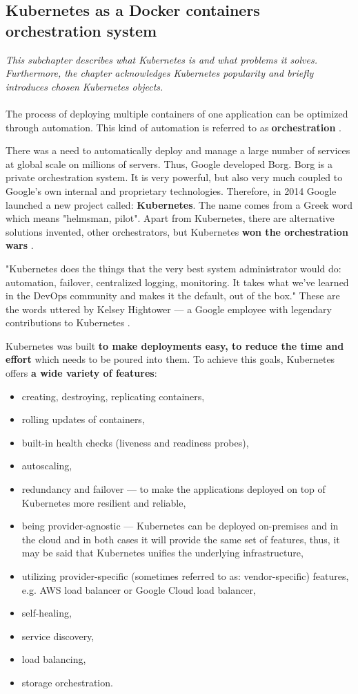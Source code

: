 \subsection{Kubernetes as a Docker containers orchestration system}
\textit{This subchapter describes what Kubernetes is and what problems it solves. Furthermore, the chapter acknowledges Kubernetes popularity and briefly introduces chosen Kubernetes objects.}
~\\
~\\
The process of deploying multiple containers of one application can be optimized through automation. This kind of automation is referred to as \textbf{orchestration} \cite{art-byza}.

There was a need to automatically deploy and manage a large number of services at global scale on millions of servers. Thus, Google developed Borg. Borg is a private orchestration system. It is very powerful, but also very much coupled to Google’s own internal and proprietary technologies. Therefore, in 2014 Google launched a new project called: \textbf{Kubernetes}. The name comes from a Greek word which means "helmsman, pilot". Apart from Kubernetes, there are alternative solutions invented, other orchestrators, but Kubernetes \textbf{won the orchestration wars} \cite{book-cndwk,article-modelling-performance-k8s}.

"Kubernetes does the things that the very best system administrator would do: automation, failover, centralized logging, monitoring. It takes what we’ve learned in the DevOps community and makes it the default, out of the box." These are the words uttered by Kelsey Hightower --- a Google employee with legendary contributions to Kubernetes \cite{book-cndwk}.

Kubernetes was built \textbf{to make deployments easy, to reduce the time and effort} which needs to be poured into them. To achieve this goals, Kubernetes offers \textbf{a wide variety of features}\cite{k8s,book-cndwk,article-state-machine}:
\begin{itemize}
\item creating, destroying, replicating containers,
\item rolling updates of containers,
\item built-in health checks (liveness and readiness probes),
\item autoscaling,
\item redundancy and failover --- to make the applications deployed on top of Kubernetes more resilient and reliable,
\item being provider-agnostic --- Kubernetes can be deployed on-premises and in the cloud and in both cases it will provide the same set of features, thus, it may be said that Kubernetes unifies the underlying infrastructure,
\item utilizing provider-specific (sometimes referred to as: vendor-specific) features, e.g. AWS load balancer or Google Cloud load balancer,
\item self-healing,
\item service discovery,
\item load balancing,
\item storage orchestration.
\end{itemize}


